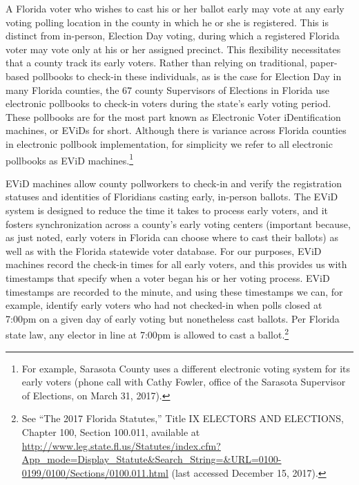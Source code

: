 \documentclass[12pt,titlepage]{article}
\begin{document}

A Florida voter who wishes to cast his or her ballot early may vote at
any early voting polling location in the county in which he or she is
registered.  This is distinct from in-person, Election Day voting,
during which a registered Florida voter may vote only at his or her
assigned precinct.  This flexibility necessitates that a county track
its early voters.  Rather than relying on traditional, paper-based
pollbooks to check-in these individuals, as is the case for Election
Day in many Florida counties, the 67 county Supervisors of Elections
in Florida use electronic pollbooks to check-in voters during the
state's early voting period.  These pollbooks are for the most part
known as Electronic Voter iDentification machines, or EViDs for short.
Although there is variance across Florida counties in electronic
pollbook implementation, for simplicity we refer to all electronic
pollbooks as EViD machines.\footnote{For example, Sarasota County uses
  a different electronic voting system for its early voters (phone
  call with Cathy Fowler, office of the Sarasota Supervisor of
  Elections, on March 31, 2017).}


EViD machines allow county pollworkers to check-in and verify the
registration statuses and identities of Floridians casting early,
in-person ballots. The EViD system is designed to reduce the time it
takes to process early voters, and it fosters synchronization across a
county's early voting centers (important because, as just noted, early
voters in Florida can choose where to cast their ballots) as well as
with the Florida statewide voter database.  For our purposes, EViD
machines record the check-in times for all early voters, and this
provides us with timestamps that specify when a voter began his or her
voting process. EViD timestamps are recorded to the minute, and using
these timestamps we can, for example, identify early voters who had
not checked-in when polls closed at 7:00pm on a given day of early
voting but nonetheless cast ballots.  Per Florida state law, any
elector in line at 7:00pm is allowed to cast a ballot.\footnote{See
  ``The 2017 Florida Statutes,'' Title IX ELECTORS AND ELECTIONS,
  Chapter 100, Section 100.011, available at
  \url{http://www.leg.state.fl.us/Statutes/index.cfm?App\_mode=Display\_Statute\&Search\_String=\&URL=0100-0199/0100/Sections/0100.011.html}
  (last accessed December 15, 2017).}
\end{document}
